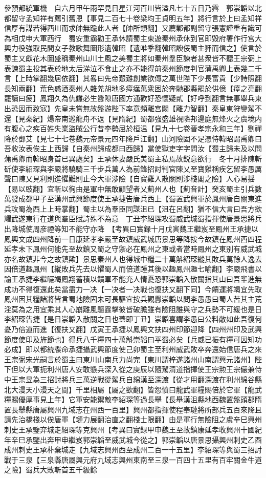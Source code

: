參預都統軍機　自六月甲午雨罕見日星江河百川皆溢凡七十五日乃霽　郭崇韜以北都留守孟知祥有薦引舊恩【事見二百七十卷梁均王貞明五年】將行言於上曰孟知祥信厚有謀若得西川而求帥無踰此人者【帥所類翻】又薦鄴都副留守張憲謹重有識可為相戊申大軍西行　蜀安重霸勸王承休請蜀主東遊秦州承休到官即毁府署作行宫大興力役強取民間女子教歌舞圖形遺韓昭【遺唯季翻韓昭諛佞蜀主狎而信之】使言於蜀主又獻花木圖盛稱秦州山川土風之美蜀主將如秦州羣臣諫者甚衆皆不聽王宗弼上表諫蜀主投其表於地太后涕泣不食止之亦不能得前秦州節度判官蒲禹卿上表幾二千言【上時掌翻幾居依翻】其畧曰先帝艱難創業欲傳之萬世陛下少長富貴【少詩照翻長知兩翻】荒色惑酒秦州人雜羌胡地多瘴癘萬衆困於奔馳郡縣罷於供億【瘴之亮翻罷讀曰疲】鳳翔久為仇讎必生釁隙唐國方通歡好恐懷疑貳【好呼到翻言無事舉兵東出恐因而致寇】先皇未嘗無故盤游陛下率意頻離宫闕【離力智翻】秦皇東狩鑾駕不還【見秦紀】煬帝南巡龍舟不返【見隋紀】蜀都強盛雄視隣邦邊庭無烽火之虞境内有腹心之疾百姓失業盜賊公行昔李勢屈於桓温【見九十七卷晉孝宗永和三年】劉禪降於鄧艾【見七十七卷魏元帝景元四年降戶江翻】山河險固不足憑恃韓昭謂禹卿曰吾收汝表俟主上西歸【自秦州歸成都曰西歸】當使獄吏字字問汝【蜀主歸未及以問蒲禹卿而韓昭身首已異處矣】王承休妻嚴氏美蜀主私焉故鋭意欲行　冬十月排陳斬斫使李紹琛與李嚴將驍騎三千步兵萬人為前鋒招討判官陳乂至寶雞稱疾乞留李愚厲聲曰陳乂見利則進懼難則止今大軍涉險【自寶雞入散關則涉棧閣之險】人心易揺【易以豉翻】宜斬以徇由是軍中無敢顧望者乂薊州人也【薊音計】癸亥蜀主引兵數萬發成都甲子至漢州武興節度使王承捷告唐兵西上【蜀置武興軍於鳳州唐自關東進兵攻蜀為西上上時掌翻】蜀主以為羣臣同謀沮已【沮在呂翻】猶不信大言曰吾方欲耀武遂東行在道與羣臣賦詩殊不為意　丁丑李紹琛攻蜀威武城蜀指揮使唐景思將兵出降城使周彦禋等知不能守亦降　【考異曰實録十月戊寅魏王繼岌至鳳州王承捷以鳳興文成四州降前一日康延孝李嚴至故鎮威武城唐景思等降按今故鎮在鳳州西四程延孝未下鳳州何能先至故鎮又蜀之守禦必在鳳州之東或者當時鳳州之東别有威武城亦名故鎮非今之故鎮歟】景思秦州人也得城中糧二十萬斛紹琛縱其敗兵萬餘人逸去因倍道趣鳳州【縱敗兵先去以懼蜀人而倍道踵其後以趣鳳州趣七喻翻】李嚴飛書以諭王承捷李繼曮竭鳳翔蓄積以饋軍不能充人情憂恐郭崇韜入散關指其山曰吾輩進無成功不得復還此矣當盡力一决【一决者一决戰也復扶又翻下同】今饋運將竭宜先取鳳州因其糧諸將皆言蜀地險固未可長驅宜按兵觀釁崇韜以問李愚愚曰蜀人苦其主荒淫莫為之用宜乘其人心崩離風驅霆擊彼皆破膽雖有險阻誰與守之兵勢不可緩也是日李紹琛告捷【是日崇韜入散關之日也蓋即丁丑】崇韜喜謂李愚曰公料敵如此吾復何憂乃倍道而進【復扶又翻】戊寅王承捷以鳳興文扶四州印節迎降【四州州印及武興節度使印及旌節也】得兵八千糧四十萬斛崇韜曰平蜀必矣【兵威已振有糧可因知功必成】即以都統牒命承捷攝武興節度使己卯蜀主至利州威武敗卒奔還始信唐兵之來王宗弼宋光嗣言於蜀主曰東川山南兵力尚完【東川謂梓遂諸州山南謂興元諸州】陛下但以大軍扼利州唐人安敢懸兵深入從之庚辰以隨駕清道指揮使王宗勲王宗儼兼侍中王宗昱為三招討將兵三萬逆戰從駕兵自綿漢至深渡【從才用翻深渡在利州綿谷縣北大漫天小漫天之間】千里相屬【屬之欲翻】皆怨憤曰龍武軍糧賜倍於它軍【龍武糧賜優厚事見上年】它軍安能禦敵李紹琛等過長舉【長舉漢沮縣地西魏置盤頭郡隋置長舉縣唐屬興州九域志在州西一百里】興州都指揮使程奉璉將所部兵五百來降且請先治橋棧以俟唐軍【璉力展翻治直之翻棧士限翻】由是軍行無險阻之虞辛巳興州刺史王承鑒弃城走紹琛等克興州【考異曰實録甲申魏王至故鎮康延孝收興州十國紀年辛巳承鑒出奔甲申繼岌郭崇韜至威武城今從之】郭崇韜以唐景思攝興州刺史乙酉成州刺史王承朴棄城走【九域志興州西至成州二百一十五里】李紹琛等與蜀三招討戰于三泉【三泉縣唐屬興元府九域志興州東南至三泉一百四十五里有百牢關金牛道之險】蜀兵大敗斬首五千級餘